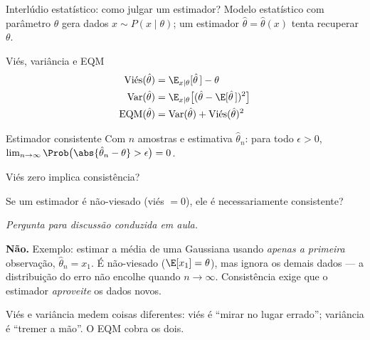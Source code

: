\documentclass[aspectratio=169, 11pt]{beamer}
\newcommand{\paradiscussao}{\vspace{-0.2em}
  {\footnotesize\color{rlCinza}\itshape Pergunta para discussão conduzida em aula.}}
\begin{document}
\begin{frame}{Interlúdio estatístico: como julgar um estimador?}
  Modelo estatístico com parâmetro $\theta$ gera dados $x \sim P(x \mid \theta)$;
  um estimador $\hat{\theta} = \hat{\theta}(x)$ tenta recuperar $\theta$.

  \begin{defbox}{Viés, variância e EQM}
    \vspace{-1.2em}
    \begin{align*}
      \text{Vi\'es}(\hat{\theta})
        &= \E_{x\mid\theta}[\hat{\theta}\,] - \theta\\
      \operatorname{Var}(\hat{\theta})
        &= \E_{x\mid\theta}\bigl[(\hat{\theta} - \E[\hat{\theta}\,])^2\bigr]\\
      \operatorname{EQM}(\hat{\theta})
        &= \operatorname{Var}(\hat{\theta})
          + \text{Vi\'es}(\hat{\theta})^2
    \end{align*}
  \end{defbox}

  \begin{defbox}{Estimador consistente}
    Com $n$ amostras e estimativa $\hat{\theta}_n$: para todo
    $\epsilon > 0$,\;
    $\lim_{n \to \infty} \Prob\bigl(\abs{\hat{\theta}_n - \theta} > \epsilon\bigr) = 0$.
  \end{defbox}
\end{frame}

\begin{frame}{Viés zero implica consistência?}
  \begin{quizbox}{}
    Se um estimador é não-viesado (viés $=0$), ele é necessariamente
    consistente?
  \end{quizbox}
  \paradiscussao

  \pause
  \begin{respbox}
    \textbf{Não.} Exemplo: estimar a média de uma Gaussiana usando
    \emph{apenas a primeira} observação, $\hat{\theta}_n = x_1$.
    É não-viesado ($\E[x_1] = \theta$), mas ignora os demais dados —
    a distribuição do erro não encolhe quando $n \to \infty$.
    Consistência exige que o estimador \emph{aproveite} os dados novos.
  \end{respbox}

  \begin{ideiabox}
    Viés e variância medem coisas diferentes: viés é ``mirar no lugar
    errado''; variância é ``tremer a mão''. O EQM cobra os dois.
  \end{ideiabox}
\end{frame}
\end{document}
